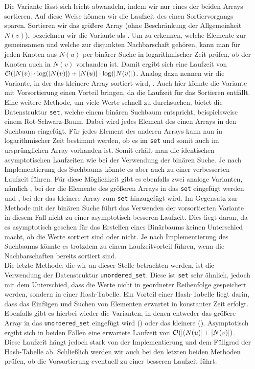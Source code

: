 Die Variante \SorSor{} lässt sich leicht abwandeln, indem wir nur eines der beiden Arrays sortieren.
Auf diese Weise können wir die Laufzeit des einen Sortiervorgangs sparen. Sortieren
wir das größere Array (ohne Beschränkung der Allgemeinheit $N(v)$), bezeichnen wir die Variante als \SorSea{}. Um zu erkennen, 
welche Elemente zur gemeinsamen und welche zur disjunkten Nachbarschaft gehören, kann man für jeden
Knoten aus $N(u)$ per binärer Suche in logarithmischer Zeit prüfen, ob der Knoten auch in $N(v)$ vorhanden ist.
Damit ergibt sich eine Laufzeit von $\mathcal{O}(|N(v)| \cdot \log(|N(v)|) + |N(u)| \cdot \log(|N(v)|)$. Analog dazu
nennen wir die Variante, in der das kleinere Array sortiert wird, \SeaSor. 
Auch hier könnte die Variante mit Vorsortierung einen Vorteil bringen, da die Laufzeit
für das Sortieren entfällt.
\\

Eine weitere Methode, um viele Werte schnell zu durchsuchen, bietet die Datenstruktur \texttt{set}, welche
einem binären Suchbaum entspricht, beispielsweise einem Rot-Schwarz-Baum.
Dabei wird jedes Element des einen Arrays in den Suchbaum eingefügt. 
Für jedes Element des anderen Arrays kann nun in logarithmischer
Zeit bestimmt werden, ob es im \texttt{set} und somit auch im ursprünglichen Array vorhanden ist.
Somit erhält man die identischen asymptotischen Laufzeiten wie bei der Verwendung der
binären Suche. Je nach Implementierung des Suchbaums könnte es aber auch zu einer verbesserten
Laufzeit führen. 
Für diese Möglichkeit gibt es ebenfalls zwei 
analoge Varianten, nämlich \SetSea, bei der die Elemente des größeren Arrays in das \texttt{set} eingefügt werden
und \SeaSet, bei der das kleinere Array zum \texttt{set} hinzugefügt wird.
Im Gegensatz zur Methode mit der binären Suche führt das Verwenden der vorsortierten Variante in diesem Fall
nicht zu einer asymptotisch besseren Laufzeit. Dies liegt daran, da es asymptotisch
gesehen für das Erstellen eines Binärbaums keinen Unterschied macht, ob die Werte sortiert sind oder nicht.
Je nach Implementierung des Suchbaums könnte es trotzdem zu einem Laufzeitvorteil führen, 
wenn die Nachbarschaften bereits sortiert sind.
\\

Die letzte Methode, die wir an dieser Stelle betrachten werden,
ist die Verwendung der Datenstruktur \texttt{unordered\_set}. Diese ist \texttt{set} sehr ähnlich, jedoch mit
dem Unterschied, dass die Werte nicht in geordneter Reihenfolge gespeichert werden, sondern
in einer Hash-Tabelle. Ein Vorteil einer Hash-Tabelle liegt darin, 
dass das Einfügen und Suchen von Elementen
erwartet in konstanter Zeit erfolgt.
Ebenfalls gibt es hierbei wieder die Varianten, 
in denen entweder das größere Array in das \texttt{unordered\_set} eingefügt wird (\USetSea) 
oder das kleinere (\SeaUSet).{}
Asymptotisch ergibt sich in beiden Fällen eine erwartete Laufzeit von $\mathcal{O}(|(N(u)| + |N(v)|)$.
Diese Laufzeit hängt jedoch stark von der Implementierung und dem Füllgrad  der Hash-Tabelle ab. 
Schließlich werden wir auch bei den letzten beiden Methoden prüfen,
 ob die Vorsortierung eventuell zu einer besseren Laufzeit führt.
\\

